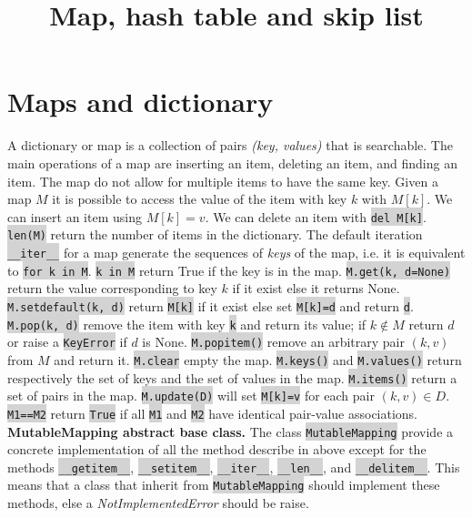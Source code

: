 \documentclass[10pt]{article}
\title{Map, hash table and skip list}
\date{}
\newcommand{\code}[1]{{\small\colorbox{LightGray}{\texttt{#1}}}}
\begin{document}
\maketitle

\section{Maps and dictionary}
\label{section:map}
A dictionary or map is a collection of pairs \emph{(key, values)} that is searchable. The main operations of a map are inserting an item, deleting an item, and finding an item. The map do not allow for multiple items to have the same key. Given a map $M$ it is possible to access the value of the item with key $k$ with $M[k]$. We can insert an item using $M[k]=v$. We can delete an item with \code{del M[k]}. \code{len(M)} return the number of items in the dictionary. The default iteration \code{\_\_iter\_\_} for a map generate the sequences of \textit{keys} of the map, i.e. it is equivalent to \code{for k in M}. \code{k in M} return True if the key is in the map. \code{M.get(k, d=None)} return the value corresponding to key $k$ if it exist else it returns None. \code{M.setdefault(k, d)} return \code{M[k]} if it exist else set \code{M[k]=d} and return \code{d}. \code{M.pop(k, d)} remove the item with key \code{k} and return its value; if $k\notin M$ return $d$ or raise a \code{KeyError} if $d$ is None. \code{M.popitem()} remove an arbitrary pair $(k, v)$ from $M$ and return it. \code{M.clear} empty the map. \code{M.keys()} and \code{M.values()} return respectively the set of keys and the set of values in the map. \code{M.items()} return a set of pairs in the map. \code{M.update(D)} will set \code{M[k]=v} for each pair $(k, v)\in D$. \code{M1==M2} return \code{True} if all \code{M1} and \code{M2} have identical pair-value associations.\\

\textbf{MutableMapping abstract base class.} The class \code{MutableMapping} provide a concrete implementation of all the method describe in above except for the methods \code{\_\_getitem\_\_}, \code{\_\_setitem\_\_}, \code{\_\_iter\_\_}, \code{\_\_len\_\_}, and \code{\_\_delitem\_\_}. This means that a class that inherit from \code{MutableMapping} should implement these methods, else a \textit{NotImplementedError} should be raise. \\
\end{document}
